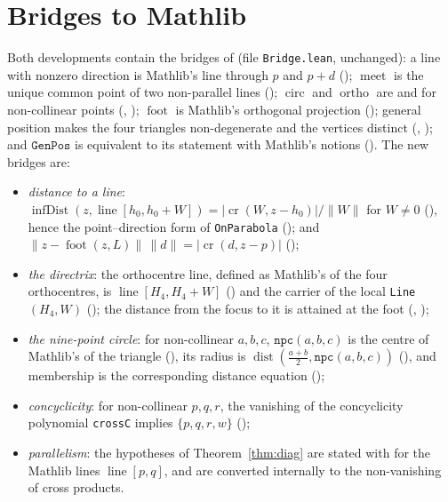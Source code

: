 \documentclass[11pt]{article}
\theoremstyle{definition}
\theoremstyle{remark}
\newcommand{\lean}[1]{\texttt{#1}}
\begin{document}
\section{Bridges to Mathlib}\label{sec:bridges}
Both developments contain the bridges of \cite{paperE} (file \lean{Bridge.lean}, unchanged): a line
with nonzero direction is Mathlib's line through $p$ and $p+d$ ();
$\operatorname{meet}$ is the unique common point of two non-parallel lines ();
$\operatorname{circ}$ and $\operatorname{ortho}$ are  and
 for non-collinear points (,
); $\operatorname{foot}$ is Mathlib's orthogonal projection
(); general position makes the four triangles
non-degenerate and the vertices distinct (,
); and $\lean{GenPos}$ is equivalent to its statement with Mathlib's
notions (). The new bridges are:
\begin{itemize}
\item \emph{distance to a line}: $\operatorname{infDist}(z,\operatorname{line}[h_0,h_0+W])=|\operatorname{cr}(W,z-h_0)|/\|W\|$
for $W\neq0$ (), hence the point--direction form of \lean{OnParabola}
(); and $\|z-\operatorname{foot}(z,L)\|\,\|d\|=|\operatorname{cr}(d,z-p)|$
();
\item \emph{the directrix}: the orthocentre line, defined as Mathlib's  of the four
orthocentres, is $\operatorname{line}[H_4,H_4+W]$ () and the carrier of the
local \lean{Line} $(H_4,W)$ (); the distance from the focus to it
is attained at the foot (, );
\item \emph{the nine-point circle}: for non-collinear $a,b,c$, $\lean{npc}(a,b,c)$ is the centre of
Mathlib's  of the triangle
(), its radius is $\operatorname{dist}(\tfrac{a+b}2,\lean{npc}(a,b,c))$
(), and membership is the corresponding distance equation
();
\item \emph{concyclicity}: for non-collinear $p,q,r$, the vanishing of the concyclicity polynomial
\lean{crossC} implies $\{p,q,r,w\}$
();
\item \emph{parallelism}: the hypotheses of Theorem~\ref{thm:diag} are stated with
 for the Mathlib lines $\operatorname{line}[p,q]$, and are converted
internally to the non-vanishing of cross products.
\end{itemize}
\end{document}
